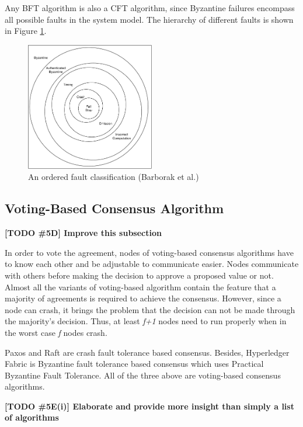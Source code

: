 \documentclass[12pt, a4paper]{article}
\newcommand{\todo}[2]{\textbf{\color{blue}[TODO \##1] #2}\par}
\begin{document}
Any BFT algorithm is also a CFT algorithm, since Byzantine failures encompass
all possible faults in the system model. The hierarchy of different faults
\cite{barborak1993consensus} is shown in Figure \ref{fig:aofc}.

\begin{figure}[htp]
  \centering
  \includegraphics[width=0.5\textwidth]{img/AOFC.pdf}
  \caption{An ordered fault classification (Barborak et al.)}
  \label{fig:aofc}
\end{figure}

\subsection{Voting-Based Consensus Algorithm}
\todo{5D}{Improve this subsection}
In order to vote the agreement, nodes of voting-based consensus algorithms have to
know each other and be adjustable to communicate easier\cite{nguyen2018survey}.
Nodes communicate with others before making the decision
to approve a proposed value or not.
Almost all the variants of voting-based algorithm contain the feature
that a majority of agreements is required to achieve the consensus.
However, since a node can crash, it brings the problem that the decision can not
be made through the majority's decision. Thus, at least \textit{f+1} nodes need
to run properly when in the worst case \textit{f} nodes crash.

Paxos\cite{lamport2001paxos} and Raft\cite{conf/usenix/OngaroO14} are
crash fault tolerance based consensus.
Besides, Hyperledger Fabric\cite{cachin2016architecture} is
Byzantine fault tolerance based consensus which
uses Practical Byzantine Fault Tolerance\cite{castro1999practical}.
All of the three above are voting-based consensus algorithms.

\todo{5E(i)}{Elaborate and provide more insight than simply a list of algorithms}
\end{document}
